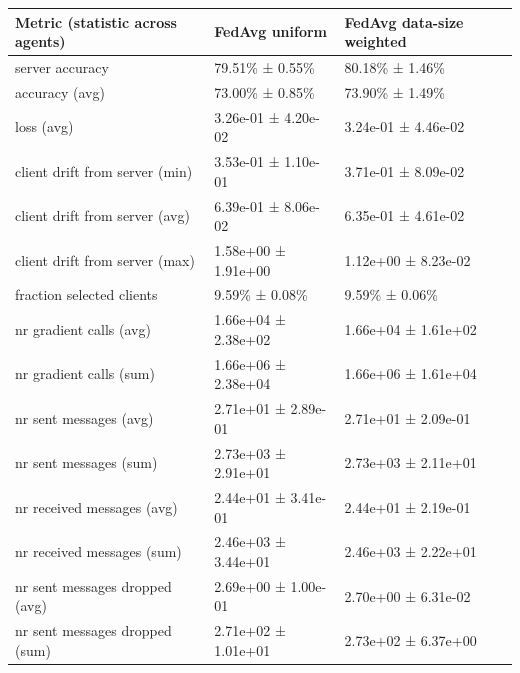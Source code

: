 \begin{tabular}{lll}
\hline
 Metric (statistic across agents)   & FedAvg uniform      & FedAvg data-size weighted   \\
\hline
 server accuracy                    & 79.51\% ± 0.55\%      & 80.18\% ± 1.46\%              \\
 accuracy (avg)                     & 73.00\% ± 0.85\%      & 73.90\% ± 1.49\%              \\
 loss (avg)                         & 3.26e-01 ± 4.20e-02 & 3.24e-01 ± 4.46e-02         \\
 client drift from server (min)     & 3.53e-01 ± 1.10e-01 & 3.71e-01 ± 8.09e-02         \\
 client drift from server (avg)     & 6.39e-01 ± 8.06e-02 & 6.35e-01 ± 4.61e-02         \\
 client drift from server (max)     & 1.58e+00 ± 1.91e+00 & 1.12e+00 ± 8.23e-02         \\
 fraction selected clients          & 9.59\% ± 0.08\%       & 9.59\% ± 0.06\%               \\
 nr gradient calls (avg)            & 1.66e+04 ± 2.38e+02 & 1.66e+04 ± 1.61e+02         \\
 nr gradient calls (sum)            & 1.66e+06 ± 2.38e+04 & 1.66e+06 ± 1.61e+04         \\
 nr sent messages (avg)             & 2.71e+01 ± 2.89e-01 & 2.71e+01 ± 2.09e-01         \\
 nr sent messages (sum)             & 2.73e+03 ± 2.91e+01 & 2.73e+03 ± 2.11e+01         \\
 nr received messages (avg)         & 2.44e+01 ± 3.41e-01 & 2.44e+01 ± 2.19e-01         \\
 nr received messages (sum)         & 2.46e+03 ± 3.44e+01 & 2.46e+03 ± 2.22e+01         \\
 nr sent messages dropped (avg)     & 2.69e+00 ± 1.00e-01 & 2.70e+00 ± 6.31e-02         \\
 nr sent messages dropped (sum)     & 2.71e+02 ± 1.01e+01 & 2.73e+02 ± 6.37e+00         \\
\hline
\end{tabular}